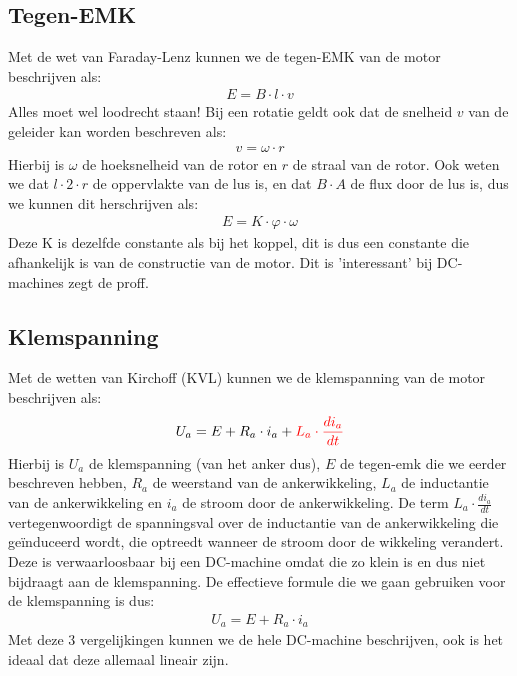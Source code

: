 \newpage

\subsection{Tegen-EMK}
Met de wet van Faraday-Lenz kunnen we de tegen-EMK van de motor beschrijven als:
\begin{align*}
    E = B \cdot l \cdot v
\end{align*}
Alles moet wel loodrecht staan!
Bij een rotatie geldt ook dat de snelheid $v$ van de geleider kan worden beschreven als:
\begin{align*}
    v = \omega \cdot r
\end{align*}
Hierbij is $\omega$ de hoeksnelheid van de rotor en $r$ de straal van de rotor.
Ook weten we dat $l \cdot 2 \cdot r$ de oppervlakte van de lus is, en dat $B \cdot A$ de
flux door de lus is, dus we kunnen dit herschrijven als:
\begin{align*}
    E = K \cdot \varphi \cdot \omega
\end{align*}
Deze K is dezelfde constante als bij het koppel, dit is dus een constante die afhankelijk
is van de constructie van de motor.
Dit is 'interessant' bij DC-machines zegt de proff.

\subsection{Klemspanning}
Met de wetten van Kirchoff (KVL) kunnen we de klemspanning van de motor beschrijven als:
\begin{align*}
   U_a = E + R_a \cdot i_a + {\color{red}L_a \cdot \frac{di_a}{dt}}
\end{align*}
Hierbij is $U_a$ de klemspanning (van het anker dus), $E$ de tegen-emk die we eerder
beschreven hebben, $R_a$ de weerstand van de ankerwikkeling, $L_a$ de inductantie van de
ankerwikkeling en $i_a$ de stroom door de ankerwikkeling.
De term $L_a \cdot \frac{di_a}{dt}$ vertegenwoordigt de spanningsval over de inductantie
van de ankerwikkeling die geïnduceerd wordt, die optreedt wanneer de stroom door de
wikkeling verandert.
Deze is verwaarloosbaar bij een DC-machine omdat die zo klein is en dus niet bijdraagt aan
de klemspanning.
De effectieve formule die we gaan gebruiken voor de klemspanning is dus:
\begin{align*}
   U_a = E + R_a \cdot i_a
\end{align*}
Met deze 3 vergelijkingen kunnen we de hele DC-machine beschrijven, ook is het ideaal dat
deze allemaal lineair zijn.

